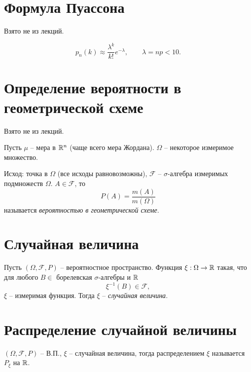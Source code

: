 \section{Формула Пуассона}

\begin{note}
	Взято не из лекций.
\end{note}

\begin{theorem}
	\[
		p_n(k) \approx \frac{\lambda ^k}{k!}e^{-\lambda } , \qquad \lambda = np < 10.
	\]
\end{theorem}

\section{Определение вероятности в геометрической схеме}

\begin{note}
	Взято не из лекций.
\end{note}

\begin{definition}
	Пусть $\mu $ -- мера в $\mathbb{R}^n$ (чаще всего мера Жордана). $\Omega $ -- некоторое измеримое множество.

	Исход: точка в $\Omega $ (все исходы равновозможны), $\mathcal{F}$ -- $\sigma $-алгебра измеримых подмножеств $\Omega $. $A \in \mathcal{F}$, то
	\[
		P(A) = \frac{m(A)}{m(\Omega )}
	\]
	называется \emph{вероятностью в геометрической схеме}.
\end{definition}

\section{Случайная величина}

\begin{definition}
	Пусть $(\Omega , \mathcal{F}, P)$ -- вероятностное пространство. Функция $\xi : \Omega  \rightarrow \mathbb{R}$ такая, что для любого $B \in $ борелевская $\sigma $-алгебры и $\mathbb{R}$
	\[
		\xi^{-1} (B) \in \mathcal{F},
	\]
	$\xi $ -- измеримая функция. Тогда $\xi $ -- \emph{случайная величина}.
\end{definition}

\section{Распределение случайной величины}

\begin{definition}
	$(\Omega, \mathcal{F},P )$ -- В.П., $\xi $ -- случайная величина, тогда распределением $\xi $ называется $P_{\xi } $ на $\mathbb{R}$.
\end{definition}

